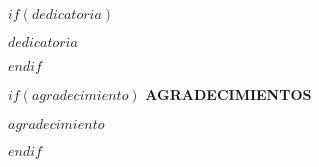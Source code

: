 
$if(dedicatoria)$
\begin{flushright}
  \vspace*{\fill}
\textit{$dedicatoria$}
\vspace*{\fill}
\end{flushright}
$endif$

\pagebreak %

$if(agradecimiento)$
\textbf{AGRADECIMIENTOS}
\begin{flushright}
\begin{minipage}{10cm}
\textit{$agradecimiento$}
\end{minipage}
\end{flushright}
$endif$
